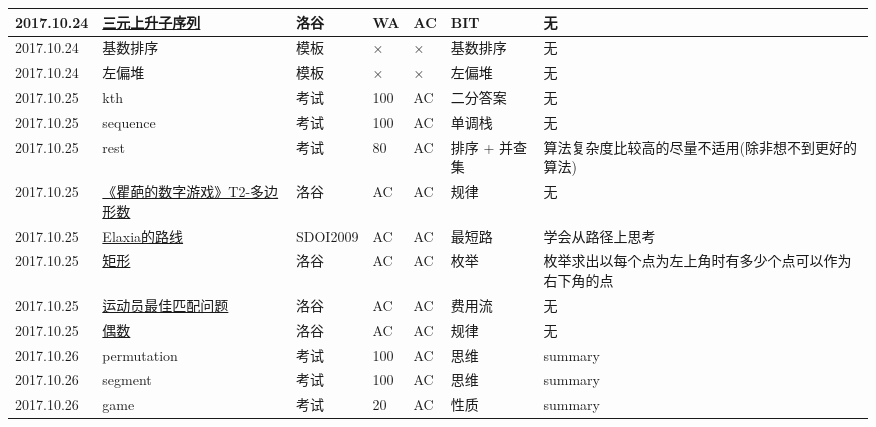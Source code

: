 \documentclass[a4paper]{article}
\begin{document}
\begin{longtable}{|p{1.5cm}|p{2.5cm}|p{1.6cm}|p{1.6cm}|p{1cm}|p{3cm}|p{4cm}|}
		\hline
		2017.10.24 & \href {https://www.luogu.org/problemnew/show/1637#sub}{三元上升子序列}
		 & 洛谷 & WA & AC & BIT & 无\\
		
		\hline
		2017.10.24 & 基数排序
		 & 模板 & × & × & 基数排序 & 无\\
		
		\hline
		2017.10.24 & 左偏堆
		 & 模板 & × & × & 左偏堆 & 无\\
		
		\hline
		2017.10.25 & kth
		 & 考试 & 100 & AC & 二分答案 & 无\\
		
		\hline
		2017.10.25 & sequence
		 & 考试 & 100 & AC & 单调栈 & 无\\
		
		\hline
		2017.10.25 & rest
		 & 考试 & 80 & AC & 排序 + 并查集 & 算法复杂度比较高的尽量不适用(除非想不到更好的算法)\\
		
		\hline
		2017.10.25 & \href {https://www.luogu.org/problemnew/show/2674#sub}{《瞿葩的数字游戏》T2-多边形数}
		 & 洛谷 & AC & AC & 规律 & 无\\
		
		\hline
		2017.10.25 & \href {https://www.luogu.org/problemnew/show/2149#sub}{Elaxia的路线}
		 & SDOI2009 & AC & AC & 最短路 & 学会从路径上思考\\
		
		\hline
		2017.10.25 & \href {https://www.luogu.org/problemnew/show/1646#sub}{矩形}
		 & 洛谷 & AC & AC & 枚举 & 枚举求出以每个点为左上角时有多少个点可以作为右下角的点\\
		
		\hline
		2017.10.25 & \href {https://www.luogu.org/problem/show?pid=1559}{运动员最佳匹配问题}
		 & 洛谷 & AC & AC & 费用流 & 无\\
		
		\hline
		2017.10.25 & \href {https://www.luogu.org/problemnew/show/1762#sub}{偶数}
		 & 洛谷 & AC & AC & 规律 & 无\\
		
		\hline
		2017.10.26 & permutation
		 & 考试 & 100 & AC & 思维 & summary\\
		
		\hline
		2017.10.26 & segment
		 & 考试 & 100 & AC & 思维 & summary\\
		
		\hline
		2017.10.26 & game
		 & 考试 & 20 & AC & 性质 & summary\\
		

\end{longtable}
\end{document}
